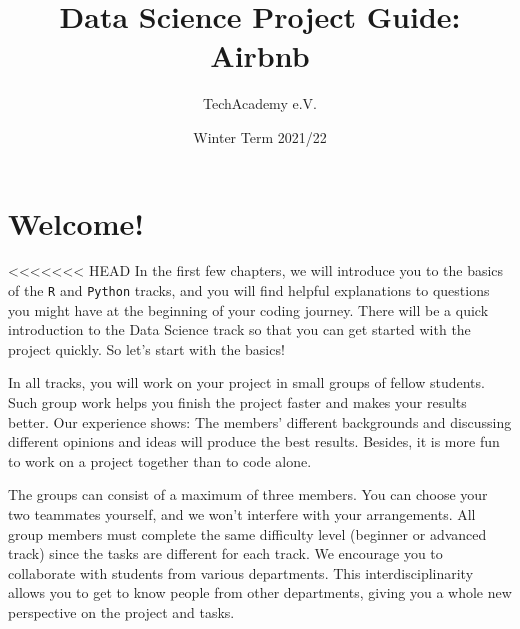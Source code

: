 \documentclass[
  11pt,
]{article}
\title{Data Science Project Guide: Airbnb}
\author{TechAcademy e.V.}
\date{Winter Term 2021/22}
\begin{document}
\maketitle

\clearpage

\addtolength{\headheight}{17.82275pt}

\fancyfoot{}
\fancyfoot[R]{\thepage}
\addtolength{\headheight}{17.82275pt}


\renewcommand{\headrulewidth}{0.25pt}
\renewcommand{\footrulewidth}{0.25pt}

\tableofcontents
\clearpage

\hypertarget{welcome}{%
\section{Welcome!}\label{welcome}}

<<<<<<< HEAD
In the first few chapters, we will introduce you to the basics of the \texttt{R} and \texttt{Python} tracks, and you will find helpful explanations to questions you might have at the beginning of your coding journey.
There will be a quick introduction to the Data Science track so that you can get started with the project quickly.
So let's start with the basics!

In all tracks, you will work on your project in small groups of fellow students.
Such group work helps you finish the project faster and makes your results better.
Our experience shows: The members' different backgrounds and discussing different opinions and ideas will produce the best results.
Besides, it is more fun to work on a project together than to code alone.

The groups can consist of a maximum of three members.
You can choose your two teammates yourself, and we won't interfere with your arrangements.
All group members must complete the same difficulty level (beginner or advanced track) since the tasks are different for each track.
We encourage you to collaborate with students from various departments.
This interdisciplinarity allows you to get to know people from other departments, giving you a whole new perspective on the project and tasks.\\
\end{document}
